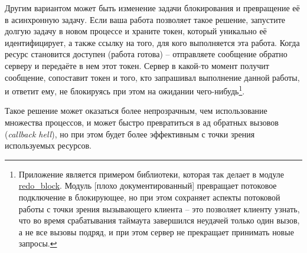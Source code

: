 \documentclass[11pt, oneside]{book}   	%
\begin{document}
Другим вариантом может быть изменение задачи блокирования и превращение её в асинхронную задачу. Если ваша работа позволяет такое решение, запустите долгую задачу в новом процессе и храните токен, который уникально её идентифицирует, а также ссылку на того, для кого выполняется эта работа. Когда ресурс становится доступен (работа готова) -- отправляете сообщение обратно серверу и передаёте в нем этот токен. Сервер в какой-то момент получит сообщение, сопоставит токен и того, кто запрашивал выполнение данной работы, и ответит ему, не блокируясь при этом на ожидании чего-нибудь\footnote{Приложение  является примером библиотеки, которая так делает в модуле \href{https://github.com/heroku/redo/blob/master/src/redo\_block.erl}{redo\_block}. Модуль [плохо документированный] превращает потоковое подключение в блокирующее, но при этом сохраняет аспекты потоковой работы с точки зрения вызывающего клиента -- это позволяет клиенту узнать, что во время срабатывания таймаута завершился неудачей только один вызов, а не все вызовы подряд, и при этом сервер не прекращает принимать новые запросы.}.

Такое решение может оказаться более непрозрачным, чем использование множества процессов, и может быстро превратиться в ад обратных вызовов (\emph{callback hell}), но при этом будет более эффективным с точки зрения используемых ресурсов.


\end{document}
